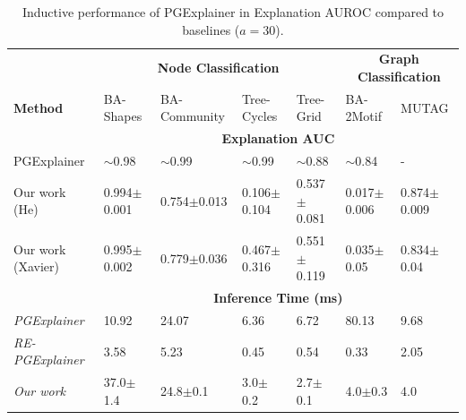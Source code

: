 \begin{table}[ht]
    \centering
    \scriptsize
    \begin{tabularx}{\textwidth}{l|XXXX|XX}   %
    \textbf{} & \multicolumn{4}{c}{\textbf{Node Classification}} & \multicolumn{2}{c}{\textbf{Graph Classification}} \\
    \textbf{Method} & BA-Shapes & BA-Community & Tree-Cycles & Tree-Grid & BA-2Motif & MUTAG \\
    \midrule
    \addlinespace
    \textbf{} & \multicolumn{6}{c}{\textbf{Explanation AUC}} \\
    \midrule
    PGExplainer & $\sim$0.98 & $\sim$0.99 & $\sim$0.99 & $\sim$0.88 & $\sim$0.84 & - \\
    \midrule
    Our work (He) & 0.994$\pm$0.001 & 0.754$\pm$0.013 & 0.106$\pm$0.104 & 0.537$\pm$0.081 & 0.017$\pm$0.006 & 0.874$\pm$0.009 \\
    \midrule
    Our work (Xavier) & 0.995$\pm$0.002 & 0.779$\pm$0.036 & 0.467$\pm$0.316 & 0.551$\pm$0.119 & 0.035$\pm$0.05 & 0.834$\pm$0.04 \\
    \midrule
    \addlinespace
    \textbf{} & \multicolumn{6}{c}{\textbf{Inference Time (ms)}} \\
    \midrule
    \textit{PGExplainer} & 10.92 & 24.07 & 6.36 & 6.72 & 80.13 & 9.68 \\
    \textit{RE-PGExplainer} & 3.58 & 5.23 & 0.45 & 0.54 & 0.33 & 2.05 \\
    \textit{Our work} & 37.0$\pm$1.4 & 24.8$\pm$0.1 & 3.0$\pm$0.2 & 2.7$\pm$0.1 & 4.0$\pm$0.3 & 4.0 \\
    \bottomrule
    \end{tabularx}
    \caption[Inductive performance of our reimplementation]{Inductive performance of PGExplainer in Explanation AUROC compared to baselines ($a=30$).}
    \label{tab:pgexplainer_auc}
\end{table}



